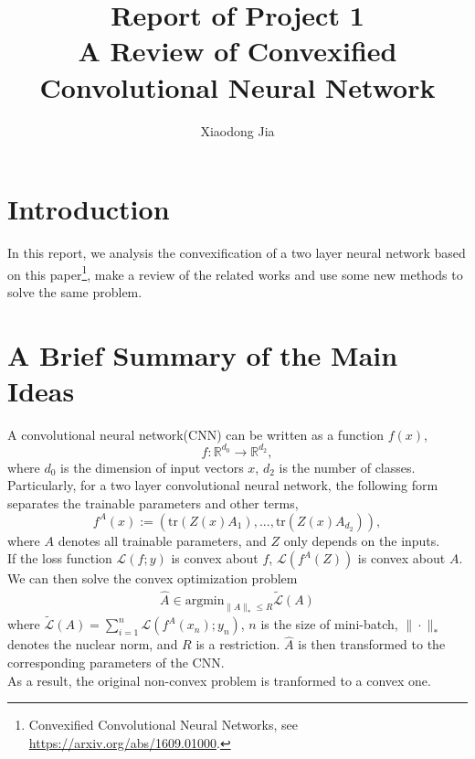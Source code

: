 \documentclass{article}
\title{Report of Project 1\\A Review of Convexified Convolutional Neural Network}
\author{Xiaodong Jia}
\begin{document}
\maketitle

\tableofcontents
\newpage

\section{Introduction}
In this report, we analysis the convexification of a two layer neural network based on this paper\footnote{Convexified Convolutional Neural Networks, see \url{https://arxiv.org/abs/1609.01000}.}, make a review of the related works and use some new methods to solve the same problem.
\section{A Brief Summary of the Main Ideas}
A convolutional neural network(CNN) can be written as a function $f(x)$,
\[f:\mathbb{R}^{d_0}\rightarrow\mathbb{R}^{d_2},\] where $d_0$ is the dimension of input vectors $x$, $d_2$ is the number of classes.\\
Particularly, for a two layer convolutional neural network, the following form separates the trainable parameters and other terms,
\[f^A(x):=(\text{tr}(Z(x)A_1),...,\text{tr}(Z(x)A_{d_2})),\]
where $A$ denotes all trainable parameters, and $Z$ only depends on the inputs.\\
If the loss function $\mathcal{L}(f;y)$ is convex about $f$, $\mathcal{L}(f^A(Z))$ is convex about $A$. We can then solve the convex optimization problem
\begin{align*}
\widehat{A}\in\text{argmin}_{\|A\|_*\leq R}\tilde{\mathcal{L}}(A)
\end{align*}
where $\tilde{\mathcal{L}}(A)=\sum_{i=1}^n\mathcal{L}(f^A(x_n);y_n)$, $n$ is the size of mini-batch, $\|\cdot\|_*$ denotes the nuclear norm, and $R$ is a restriction. $\widehat{A}$ is then transformed to the corresponding parameters of the CNN. \\As a result, the original non-convex problem is tranformed to a convex one. 
\end{document}
